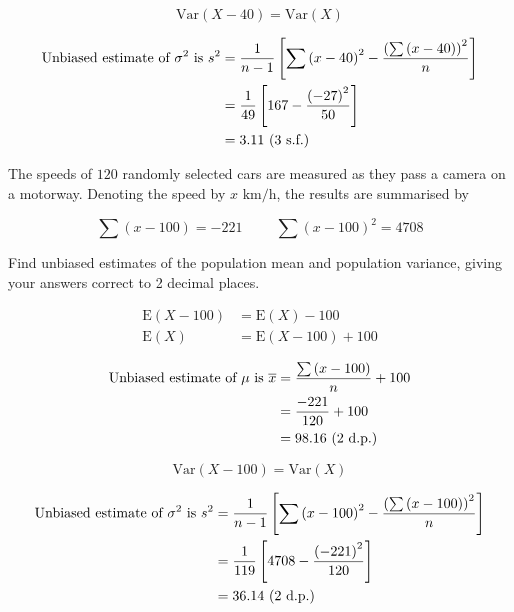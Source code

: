 \documentclass[11pt,a4paper]{book}
\begin{document}
\begin{example}
\begin{enumerate}[label=(\alph*)]
\[
\text{Var}\left(X-40\right)=\text{Var}\left(X\right)
\]

\begin{align*}
\text{Unbiased estimate of \ensuremath{\sigma^{2}} is }s^{2} & =\frac{1}{n-1}\left[\sum\left(x-40\right)^{2}-\frac{\left(\sum\left(x-40\right)\right)^{2}}{n}\right]\\
 & =\frac{1}{49}\left[167-\frac{\left(-27\right)^{2}}{50}\right]\\
 & =3.11\text{ (3 s.f.)}
\end{align*}

\end{enumerate}

\end{example}

\begin{example}

The speeds of $120$ randomly selected cars are measured as they pass
a camera on a motorway. Denoting the speed by $x\text{ km/h}$, the
results are summarised by

\[
\sum\left(x-100\right)=-221\hspace{1cm}\sum\left(x-100\right)^{2}=4708
\]

Find unbiased estimates of the population mean and population variance,
giving your answers correct to 2 decimal places.

\Solution

\begin{align*}
\text{E}\left(X-100\right) & =\text{E}\left(X\right)-100\\
\text{E}\left(X\right) & =\text{E}\left(X-100\right)+100
\end{align*}

\begin{align*}
\text{Unbiased estimate of \ensuremath{\mu} is }\overline{x} & =\frac{\sum\left(x-100\right)}{n}+100\\
 & =\frac{-221}{120}+100\\
 & =98.16\text{ (2 d.p.)}
\end{align*}

\[
\text{Var}\left(X-100\right)=\text{Var}\left(X\right)
\]

\begin{align*}
\text{Unbiased estimate of \ensuremath{\sigma^{2}} is }s^{2} & =\frac{1}{n-1}\left[\sum\left(x-100\right)^{2}-\frac{\left(\sum\left(x-100\right)\right)^{2}}{n}\right]\\
 & =\frac{1}{119}\left[4708-\frac{\left(-221\right)^{2}}{120}\right]\\
 & =36.14\text{ (2 d.p.)}
\end{align*}

\end{example}
\end{document}
